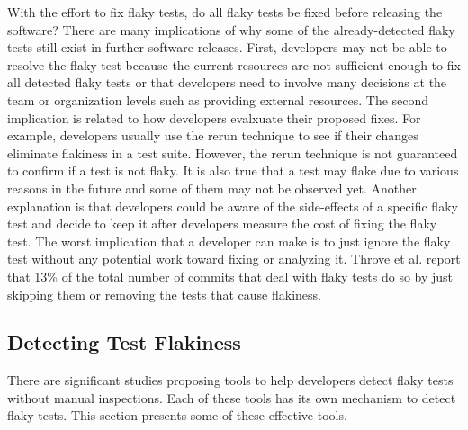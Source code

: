 With the effort to fix flaky tests, do all flaky tests be fixed before releasing the software? There are many implications of why some of the already-detected flaky tests still exist in further software releases. First, developers may not be able to resolve the flaky test because the current resources are not sufficient enough to fix all detected flaky tests or that developers need to involve many decisions at the team or organization levels such as providing external resources. The second implication is related to how developers evalxuate their proposed fixes. For example, developers usually use the rerun technique to see if their changes eliminate flakiness in a test suite. However, the rerun technique is not guaranteed to confirm if a test is not flaky. It is also true that a test may flake due to various reasons in the future and some of them may not be observed yet. Another explanation is that developers could be aware of the side-effects of a specific flaky test and decide to keep it after developers measure the cost of fixing the flaky test. The worst implication that a developer can make is to just ignore the flaky test without any potential work toward fixing or analyzing it. Throve et al. \cite{thorve2018empirical} report that 13\% of the total number of commits that deal with flaky tests do so by just skipping them or removing the tests that cause flakiness.


\subsection{Detecting Test Flakiness}


There are significant studies proposing tools to help developers detect flaky tests without manual inspections. Each of these tools has its own mechanism to detect flaky tests. This section presents some of these effective tools. 


